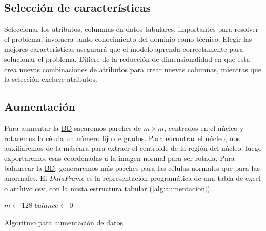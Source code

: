 \subsection{Selección de características}

Seleccionar los atributos, columnas en datos tabulares, importantes para
resolver el problema, involucra tanto conocimiento del dominio como técnico.
Elegir las mejores características asegurará que el modelo aprenda correctamente
para solucionar el problema. Difiere de la reducción de dimensionalidad en que
esta crea nuevas combinaciones de atributos para crear nuevas columnas, mientras
que la selección excluye atributos.

\subsection{Aumentación}

Para aumentar la \hyperlink{abbr}{BD} sacaremos parches de \(m \times m\),
centrados en el núcleo y rotaremos la célula un número fijo de grados. Para
encontrar el núcleo, nos auxiliaremos de la máscara para extraer el centroide de
la región del núcleo; luego exportaremos esas coordenadas a la imagen normal
para ser rotada. Para balancear la \hyperlink{abbr}{BD}, generaremos más parches
para las células normales que para las anormales. El \emph{DataFrame} es la
representación programática de una tabla de excel o archivo csv, con la mista
estructura tabular (\autoref{alg:aumentacion}). 

\begin{algorithm}[H]
    \SetAlgoLined{}
    \(m \longleftarrow 128\)
    \BlankLine{}
    \(balance \longleftarrow 0\)
    \BlankLine{}
    \caption{Algoritmo para aumentación de datos}\label{alg:aumentacion}
\end{algorithm}

